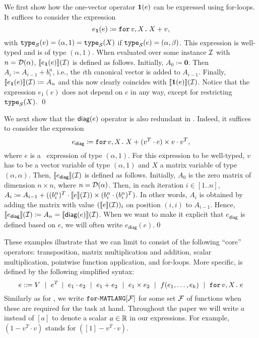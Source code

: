 \begin{example}\label{ex:onevec}
We first show how the one-vector operator $\mathbf{1}(e)$ can be expressed using for-loops.
It suffices to consider the expression
$$e_{\mathbf{1}}(e)\coloneqq \texttt{for}\, v,X \texttt{.}\, X+v,$$
with $\texttt{type}_{\mathcal{S}}(v)=(\alpha,1)=\texttt{type}_{\mathcal{S}}(X)$ if $\texttt{type}_{\mathcal{S}}(e)=(\alpha,\beta)$. This expression is well-typed
and is of type $(\alpha,1)$. When evaluated over some instance $\mathcal{I}$ with $n=\mathcal{D}(\alpha)$, $\llbracket e_{\mathbf{1}}(e) \rrbracket(\mathcal{I})$ is defined as follows.
Initially, $A_0\coloneqq \mathbf{0}$. Then $A_i\coloneqq A_{i-1}+b_i^n$, i.e., the $i$th canonical vector is added to $A_{i-1}$.
Finally, $\llbracket e_{\mathbf{1}}(e) \rrbracket(\mathcal{I})\coloneqq A_n$ and this now clearly coincides with $\llbracket \mathbf{1}(e) \rrbracket(\mathcal{I})$. Notice that the expression $e_1(e)$ does not depend on $e$ in any way, except for restricting $\texttt{type}_{\mathcal{S}}(X)$. \qed
\end{example}

\begin{example}\label{ex:diag}
We next show that the $\textsf{diag}(e)$ operator is also redundant in \langfor.
Indeed, it suffices to consider the expression
$$e_{\mathsf{diag}}\coloneqq 
\texttt{for}\, v,X \texttt{.}\, X + (v^T\cdot e) \times v\cdot v^T,$$ where $e$ is a \langfor\  expression of type $(\alpha,1)$. For this expression to be well-typed, $v$ has to be a vector variable of type $(\alpha,1)$ and $X$ a matrix variable of type $(\alpha,\alpha)$. Then, $\llbracket e_{\mathsf{diag}} \rrbracket(\mathcal{I})$ is defined as follows.
Initially, $A_0$ is the zero matrix of dimension $n\times n$, where $n=\mathcal{D}(\alpha)$. Then, in each iteration
$i\in[1..n]$, $A_{i}\coloneqq A_{i-1}+  ((b_i^n)^T\cdot\llbracket e \rrbracket(\mathcal{I}))\times (b_i^n\cdot (b_i^n)^T)$. In other words, $A_i$ is obtained by adding the matrix with value $(\llbracket e \rrbracket(\mathcal{I}))_i$ on position $(i,i)$ to $A_{i-1}$. Hence, $\llbracket e_{\mathsf{diag}} \rrbracket(\mathcal{I})\coloneqq A_n=\llbracket \textsf{diag}(e) \rrbracket(\mathcal{I})$. When we want to make it explicit that $e_\mathsf{diag}$ is defined based on $e$, we will often write $e_\mathsf{diag}(e)$.\qed
 \end{example}

These examples illustrate that we can limit \langfor to consist of the following ``core'' operators: transposition, matrix multiplication and addition, scalar multiplication, pointwise function application, and for-loops. More specific, \langfor is defined by the following simplified syntax:
$$
e :\coloneqq  V \ \mid \ e^T \!\ \mid \ e_1 \cdot e_2 \ \mid \ e_1 + e_2 \ \mid \ e_1\times e_2  \ \mid \  f(e_1,\ldots ,e_k) \ \mid \ \texttt{for}\, v,X \texttt{.}\, e
$$
Similarly as for \lang, we write $\texttt{for}\text{-}\texttt{MATLANG}[\mathcal{F}]$ for some set $\mathcal{F}$ of functions when these are required for the task at hand. Throughout the paper we will write $a$ instead of $[a]$ to denote a scalar $a\in\mathbb{R}$ in our expressions. For example,  $(1-v^T\cdot v)$ stands for  $([1]-v^T\cdot v)$. 

